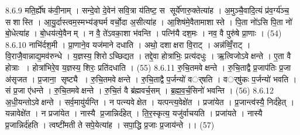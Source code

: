 8.6.9
मति॒र्ह्ये॑ष क॑वी॒नाम् । सन्दे॒वो दे॒वेन॑ सवि॒त्रा य॑तिष्ट॒ स सूर्ये॑णारु॒क्तेत्या॑ह । अ॒मुञ्चै॒वादि॒त्यं प्र॑व॒र्ग्य॑ञ्च॒ सशास्ति । आ॒यु॒र्दास्त्वम॒स्मभ्य॑ङ्घर्म वर्चो॒दा अ॒सीत्या॑ह । आ॒शिष॑मे॒वैतामाशास्ते । पि॒ता नो॑ऽसि पि॒ता नो॑ बो॒धेत्या॑ह । बो॒धय॑त्ये॒वैनम् । न वै॒ ते॑ऽवका॒शा भ॑वन्ति । पत्नि॑यै दश॒मः । नव॒ वै पुरु॑षे प्रा॒णाः । (54)
8.6.10
नाभि॑र्दश॒मी । प्रा॒णाने॒व यज॑माने दधाति । अथो॒ दशाक्षरा वि॒राट् । अन्न॑व्विँ॒राट् । वि॒राजै॒वान्नाद्य॒मव॑रुन्धे । य॒ज्ञस्य॒ शिरोऽच्छिद्यत । तद्दे॒वा होत्रा॑भिः॒ प्रत्य॑दधुः । ऋ॒त्विजोऽवेक्षन्ते । ए॒ता वै होत्राः । होत्रा॑भिरे॒व य॒ज्ञस्य॒ शिरः॒ प्रति॑दधाति । (55)
8.6.11
रु॒चि॒तमवेक्षन्ते । रु॒चि॒ताद्वै प्र॒जाप॑तिः प्र॒जा अ॑सृजत । प्र॒जाना॒ सृष्ट्यै । रु॒चि॒तमवेक्षन्ते । रु॒चि॒ताद्वै प॒र्जन्यो॑ वर््षति । वर््षु॑कः प॒र्जन्यो॑ भवति । सं प्र॒जा ए॑धन्ते । रु॒चि॒तमवेक्षन्ते । रु॒चि॒तं वै ब्र॑ह्मवर्च॒सम् । ब्र॒ह्म॒व॒र्च॒सिनो॑ भवन्ति । (56)
8.6.12
अ॒धी॒यन्तोऽवेक्षन्ते । सर्व॒मायु॑र्यन्ति । न पत्न्यवेक्षेत । यत्पन्त्य॒वेक्षे॑त । प्रजा॑येत । प्र॒जान्त्व॑स्यै॒ निर्द॑हेत् । यन्नावेक्षे॑त । न प्रजा॑येत । नास्यै प्र॒जान्निर्द॑हेत् । ति॒र॒स्कृत्य॒ यजु॑र्वाचयति । प्रजा॑यते । नास्यै प्र॒जान्निर्द॑हति । त्वष्टी॑मती ते सपे॒येत्या॑ह । सपा॒द्धि प्र॒जाः प्र॒जाय॑न्ते ।। (57)
\anuvakamend

